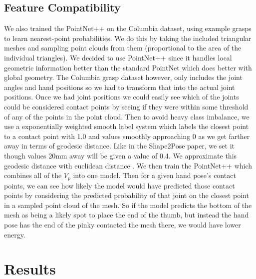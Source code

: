 \documentclass[10pt,twocolumn,letterpaper]{article}
\begin{document}
\subsection{Feature Compatibility}
We also trained the PointNet++ on the Columbia dataset, using example grasps to learn nearest-point probabilities. We do this by taking the included triangular meshes and sampling point clouds from them (proportional to the area of the individual triangles). We decided to use PointNet++ since it handles local geometric information better than the standard PointNet which does better with global geometry. The Columbia grasp dataset however, only includes the joint angles and hand positions so we had to transform that into the actual joint positions. Once we had joint positions we could easily see which of the joints could be considered contact points by seeing if they were within some threshold of any of the points in the point cloud. Then to avoid heavy class imbalance, we use a exponentially weighted smooth label system which labels the closest point to a contact point with 1.0 and values smoothly approaching 0 as we get farther away in terms of geodesic distance. Like in the Shape2Pose paper, we set it though values 20mm away will be given a value of 0.4. We approximate this geodesic distance with euclidean distance \cite{geodesic}. We then train the PointNet++ which combines all of the $V_p$ into one model. Then for a given hand pose's contact points, we can see how likely the model would have predicted those contact points by considering the predicted probability of that joint on the closest point in a sampled point cloud of the mesh. So if the model predicts the bottom of the mesh as being a likely spot to place the end of the thumb, but instead the hand pose has the end of the pinky contacted the mesh there, we would have lower energy.

\section{Results}
\end{document}
